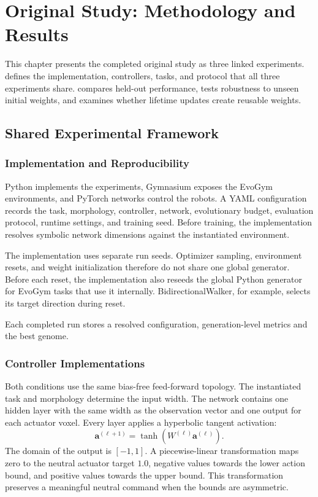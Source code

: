 \chapter{Original Study: Methodology and Results}
\label{cha:original-study}

This chapter presents the completed original study as three linked experiments.  defines the implementation, controllers, tasks, and protocol that all three experiments share.  compares held-out performance,  tests robustness to unseen initial weights, and  examines whether lifetime updates create reusable weights.
\section{Shared Experimental Framework}
\label{sec:shared-framework}

\subsection{Implementation and Reproducibility}

Python implements the experiments, Gymnasium exposes the EvoGym environments, and PyTorch networks control the robots. A YAML configuration records the task, morphology, controller, network, evolutionary budget, evaluation protocol, runtime settings, and training seed. Before training, the implementation resolves symbolic network dimensions against the instantiated environment.

The implementation uses separate run seeds. Optimizer sampling, environment resets, and \nchl{} weight initialization therefore do not share one global generator. Before each reset, the implementation also reseeds the global Python generator for EvoGym tasks that use it internally. BidirectionalWalker, for example, selects its target direction during reset.

Each completed run stores a resolved configuration, generation-level metrics and the best genome.

\subsection{Controller Implementations}

Both conditions use the same bias-free feed-forward topology. The instantiated task and morphology determine the input width. The network contains one hidden layer with the same width as the observation vector and one output for each actuator voxel. Every layer applies a hyperbolic tangent activation:
\begin{equation}
  \mathbf{a}^{(\ell+1)}=\tanh\!\left(W^{(\ell)}\mathbf{a}^{(\ell)}\right).
  \label{eq:forward}
\end{equation}
The domain of the output is $[-1,1]$. A piecewise-linear transformation maps zero to the neutral actuator target $1.0$, negative values towards the lower action bound, and positive values towards the upper bound. This transformation preserves a meaningful neutral command when the bounds are asymmetric.

